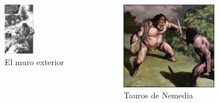 \begin{frame}{}
\begin{columns}
    \begin{figure}[htb]
    \centering
        \includegraphics[width=0.5\textwidth]{img/res/07}
        \caption{El muro exterior}
    \end{figure}
    \begin{figure}[htb]
    \centering
        \includegraphics[width=0.7\textwidth]{img/res/08}
        \caption{Tauros de Nemedia}
    \end{figure}
\end{columns}
\end{frame}

